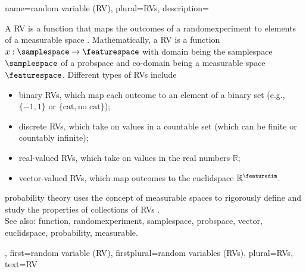 {name={random variable (RV)}, plural={RVs},
 	description={A RV is a \gls{function} that maps the 
		outcomes of a \gls{randomexperiment} to elements of a \gls{measurable} space 
		\cite{BillingsleyProbMeasure,GrayProbBook}. 
 		Mathematically, a RV is a \gls{function} $x: \samplespace \rightarrow \featurespace$ 
		with domain being the \gls{samplespace} $\samplespace$ of a \gls{probspace} and 
		co-domain being a \gls{measurable} space $\featurespace$. 
 		Different types of RVs include  
 		\begin{itemize} 
 			\item {binary RVs}, which map each outcome to an element of a binary 
			set (e.g., $\{-1,1\}$ or $\{\text{cat}, \text{no cat}\}$); 
			\item {discrete RVs}, which take on values in a countable set (which can 
			be finite or countably infinite); 
 			\item {real-valued RVs}, which take on values in the real numbers $\mathbb{R}$;  
 			\item {\gls{vector}-valued RVs}, which map outcomes to the \gls{euclidspace} $\mathbb{R}^{\featuredim}$.  
 		\end{itemize} 
 		\Gls{probability} theory uses the concept of \gls{measurable} spaces to rigorously define 
 		and study the properties of collections of RVs \cite{BillingsleyProbMeasure}.
			\\
		See also: \gls{function}, \gls{randomexperiment}, \gls{samplespace}, \gls{probspace}, \gls{vector}, \gls{euclidspace}, \gls{probability}, \gls{measurable}.}, 
	first={random variable (RV)},
	firstplural={random variables (RVs)},
	plural={RVs},
	text={RV}  
}
 
